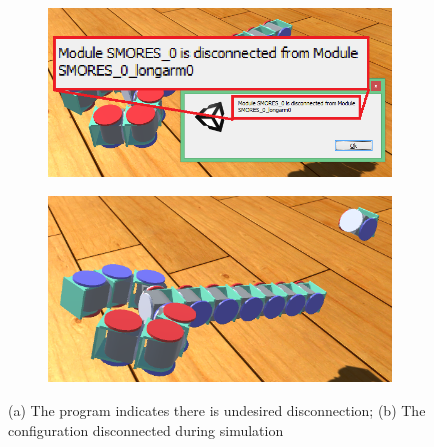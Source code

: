 \documentclass[graybox]{svmult}
\newcommand{\TODO}[1]{ {\bf \textcolor{red}{TODO:} #1 }}
\begin{document}
\begin{figure}
\begin{center}
        \begin{subfigure}[b]{0.48\columnwidth}
                \includegraphics[width=\textwidth]{images/library/unity/breakJoint.png}
                \caption{}
                \label{fig:break_joint1}
           \end{subfigure}
        \begin{subfigure}[b]{0.48\columnwidth}
                \includegraphics[width=\textwidth]{images/library/unity/breakJoint2.png}
                \caption{}
                \label{fig:break_joint2}
        \end{subfigure}
\end{center}
\caption{(a) The program indicates there is undesired disconnection; (b) The configuration disconnected during simulation}
\label{fig:break_joint}
\end{figure}


\end{document}
